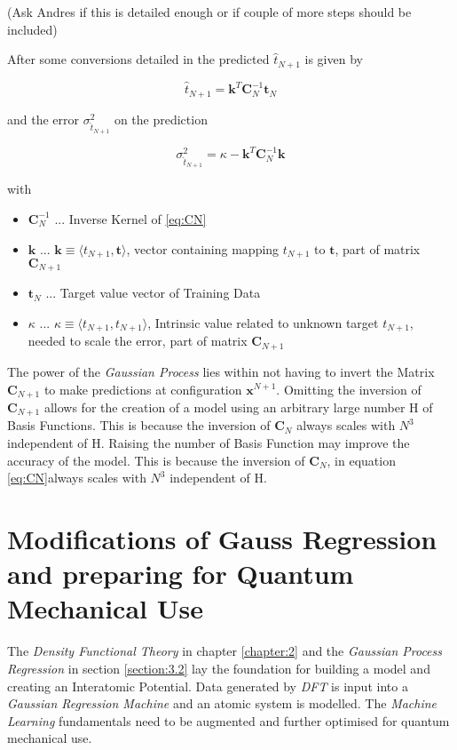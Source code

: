 (Ask Andres if this is detailed enough or if couple of more steps should be included)


After some conversions detailed in  \cite[543]{GAP-info-theory} the predicted $\hat{t}_{N+1}$ is given by 

\begin{equation}
	\hat{t}_{N+1} = \textbf{k}^T \textbf{C}_N^{-1} \textbf{t}_N
	\label{eq:tN+1}
\end{equation}

and the error  $\sigma_{\hat{t}_{N+1}}^{2}$ on the prediction 

\begin{equation}
	\sigma_{\hat{t}_{N+1}}^{2} = \kappa - \textbf{k}^T \textbf{C}_N^{-1} \textbf{k}
	\label{eq:errorN+1}
\end{equation}

with 

\begin{itemize}
	\item $ \textbf{C}_N^{-1} $ ... Inverse Kernel of \ref{eq:CN}
	\item $ \textbf{k} $ ... $\textbf{k} \equiv \langle t_{N+1},\textbf{t} \rangle$, vector containing mapping $t_{N+1}$ to $\textbf{t}$, part of matrix $\textbf{C}_{N+1}$
	\item $ \textbf{t}_N $ ... Target value vector of Training Data 
	\item $ \kappa $ ... $\kappa \equiv \langle t_{N+1},t_{N+1}\rangle$, Intrinsic value related to unknown target $t_{N+1}$, needed to scale the error, part of matrix $\textbf{C}_{N+1}$
\end{itemize}

The power of the \textit{Gaussian Process} lies within not having to invert the Matrix $\textbf{C}_{N+1}$ to make predictions at configuration $\textbf{x}^{N+1}$. Omitting the inversion of $\textbf{C}_{N+1}$ allows for the creation of a model using an arbitrary large number H of Basis Functions. This is because the inversion of  $\textbf{C}_{N}$ always scales with $N^3$ independent of H. Raising the number of Basis Function may improve the accuracy of the model. This is because the inversion of  $\textbf{C}_{N}$, in equation \ref{eq:CN}always scales with $N^3$ independent of H. 


\section{Modifications of Gauss Regression and preparing for Quantum Mechanical Use}
\label{section:3.3}
The \textit{Density Functional Theory} in chapter \ref{chapter:2} and the \textit{Gaussian Process Regression} in section \ref{section:3.2} lay the foundation for building a model and creating an Interatomic Potential. Data generated by \textit{DFT} is input into a \textit{Gaussian Regression Machine} and an atomic system is modelled. 
The \textit{Machine Learning} fundamentals need to be augmented and further optimised for quantum mechanical use. 



